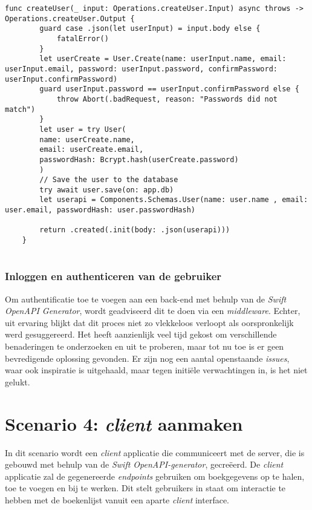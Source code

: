 \begin{lstlisting}[caption=handler file]
    func createUser(_ input: Operations.createUser.Input) async throws -> Operations.createUser.Output {
        guard case .json(let userInput) = input.body else {
            fatalError()
        }
        let userCreate = User.Create(name: userInput.name, email: userInput.email, password: userInput.password, confirmPassword: userInput.confirmPassword)
        guard userInput.password == userInput.confirmPassword else {
            throw Abort(.badRequest, reason: "Passwords did not match")
        }
        let user = try User(
        name: userCreate.name,
        email: userCreate.email,
        passwordHash: Bcrypt.hash(userCreate.password)
        )
        // Save the user to the database
        try await user.save(on: app.db)
        let userapi = Components.Schemas.User(name: user.name , email: user.email, passwordHash: user.passwordHash)
        
        return .created(.init(body: .json(userapi)))
    }
    
\end{lstlisting}
 
 \subsubsection{Inloggen en authenticeren van de gebruiker}
Om authentificatie toe te voegen aan een back-end met behulp van de \textit{Swift OpenAPI Generator}, wordt geadviseerd dit te doen via een  \textit{middleware}.  Echter, uit ervaring blijkt dat dit proces niet zo vlekkeloos verloopt als oorspronkelijk werd gesuggereerd. Het heeft aanzienlijk veel tijd gekost om verschillende benaderingen te onderzoeken en uit te proberen, maar tot nu toe is er geen bevredigende oplossing gevonden. Er zijn nog een aantal openstaande  \textit{issues}, waar ook inspiratie is uitgehaald, maar tegen initiële verwachtingen in, is het niet gelukt. 
  \newpage
 
\section{Scenario 4: \textit{client} aanmaken}
In dit scenario wordt een \textit{client} applicatie die communiceert met de server, die is gebouwd met behulp van de  \textit{Swift OpenAPI-generator}, gecreëerd. De \textit{client} applicatie zal de gegenereerde \textit{endpoints} gebruiken om boekgegevens op te halen, toe te voegen en bij te werken. Dit stelt gebruikers in staat om interactie te hebben met de boekenlijst vanuit een aparte \textit{client} interface.


